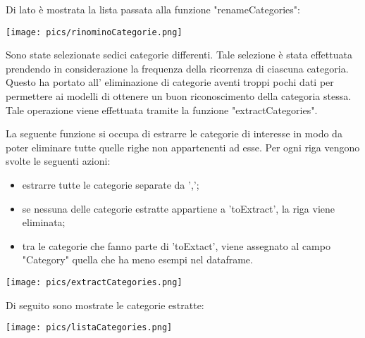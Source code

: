 \documentclass[12pt,oneside]{article}
\begin{document}
\begin{enumerate}
    \begin{minipage}[t]{0.39\textwidth}
    \vspace{30pt}
    Di lato è mostrata la lista passata alla funzione "renameCategories":
    \end{minipage}
    \hfill
    \begin{minipage}[t]{0.50\textwidth}
    \vspace{20pt}
    \texttt{[image: pics/rinominoCategorie.png]}
    \end{minipage}
    
    \begin{justify}
    Sono state selezionate sedici categorie differenti. Tale selezione è stata effettuata prendendo in considerazione la frequenza della ricorrenza di ciascuna categoria. Questo ha portato all' eliminazione di categorie aventi troppi pochi dati per permettere ai modelli di ottenere un buon riconoscimento della categoria stessa. Tale operazione viene effettuata tramite la funzione "extractCategories".
    \end{justify}

    \begin{justify}
    La seguente funzione si occupa di estrarre le categorie di interesse in modo da poter eliminare tutte quelle righe non appartenenti ad esse. 
    Per ogni riga vengono svolte le seguenti azioni:
    \begin{itemize}
        \item estrarre tutte le categorie separate da ',';
        \item se nessuna delle categorie estratte appartiene a 'toExtract', la riga viene eliminata;
        \item tra le categorie che fanno parte di 'toExtact', viene assegnato al campo "Category" quella che ha meno esempi nel dataframe.
    \end{itemize}
    \end{justify}

    \texttt{[image: pics/extractCategories.png]}

    \begin{justify}
    Di seguito sono mostrate le categorie estratte: 
    \end{justify}
    \texttt{[image: pics/listaCategories.png]}


\end{enumerate}
\end{document}
